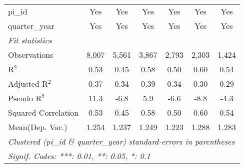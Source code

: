 \begin{tabular}{lcccccc}
   pi\_id                                                     & Yes            & Yes           & Yes           & Yes           & Yes         & Yes\\  
   quarter\_year                                              & Yes            & Yes           & Yes           & Yes           & Yes         & Yes\\  
   \midrule
   \emph{Fit statistics}\\
   Observations                                               & 8,007          & 5,561         & 3,867         & 2,793         & 2,303       & 1,424\\  
   R$^2$                                                      & 0.53           & 0.45          & 0.58          & 0.50          & 0.60        & 0.54\\  
   Adjusted R$^2$                                             & 0.37           & 0.34          & 0.39          & 0.34          & 0.30        & 0.29\\  
   Pseudo R$^2$                                               & 11.3           & -6.8          & 5.9           & -6.6          & -8.8        & -4.3\\  
   Squared Correlation                                        & 0.53           & 0.45          & 0.58          & 0.50          & 0.60        & 0.54\\  
Mean(Dep. Var.) & 1.254 & 1.237 & 1.249 & 1.223 & 1.288 & 1.283 \\
   \midrule \midrule
   \multicolumn{7}{l}{\emph{Clustered (pi\_id \& quarter\_year) standard-errors in parentheses}}\\
   \multicolumn{7}{l}{\emph{Signif. Codes: ***: 0.01, **: 0.05, *: 0.1}}\\
\end{tabular}
\par\endgroup

